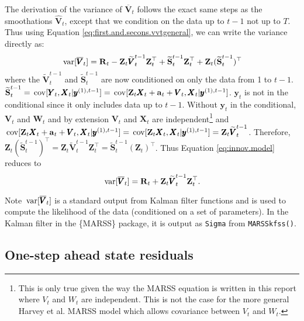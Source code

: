 \documentclass[]{article}
\def\XI{\mbox{\boldmath $\Xi$}}
\def\RR{\mbox{$\mathbf R$}}	 \def\rr{\mbox{$\mathbf r$}} \def\Rb{\mbox{$\mathbf H$}}	\def\Rm{\mathbb{R}}
\def\Ss{\mbox{$\mathbf S$}}
\def\VV{\mbox{$\pmb{V}$}}	\def\vv{\mbox{$\pmb{v}$}}
\def\WW{\mbox{$\pmb{W}$}}	\def\ww{\mbox{$\pmb{w}$}}
\def\XX{\mbox{$\pmb{X}$}}	\def\xx{\mbox{$\pmb{x}$}}
\def\YY{\mbox{$\pmb{Y}$}}	\def\yy{\mbox{$\pmb{y}$}}
\def\ZZ{\mbox{$\mathbf Z$}}	\def\zz{\mbox{$\mathbf z$}}	\def\Zb{\mbox{$\mathbf M$}} \def\Za{\mbox{$\mathbf N$}} \def\Zm{\XI}
\def\var{\,\textup{\textrm{var}}}
\def\cov{\,\textup{\textrm{cov}}}
\def\hatVt{\widehat{\VV}_t}
\def\checkVt{\overline{\VV}_t}
\def\hatVttm{\widetilde{\VV}_t^{t-1}}
\def\hatSttm{\widetilde{\Ss}_t^{t-1}}
\begin{document}
The derivation of the variance of $\checkVt$ follows the exact same steps as the smoothations $\hatVt$, except that we condition on the data up to $t-1$ not up to $T$. Thus using Equation \ref{eq:first.and.secons.vvtgeneral}, we can write the variance directly as:
\begin{equation}\label{eq:innov.model}
\var[\checkVt] = \RR_t - \ZZ_t \hatVttm \ZZ_t^\top + \hatSttm\ZZ_t^\top + \ZZ_t(\hatSttm)^\top
\end{equation}
where the $\hatVttm$ and $\hatSttm$ are now conditioned on only the data from 1 to $t-1$.
$\hatSttm = \cov[\YY_t,\XX_t|\yy^{(1), t-1}] = \cov[\ZZ_t \XX_t + \aa_t+\VV_t,\XX_t|\yy^{(1), t-1}]$. 
$\yy_t$ is not in the conditional since it only includes data up to $t-1$. Without $\yy_t$ in the conditional, $\VV_t$ and $\WW_t$ and by extension $\VV_t$ and $\XX_t$ are independent\footnote{This is only true given the way the MARSS equation is written in this report where $V_t$ and $W_t$ are independent. This is not the case for the more general Harvey et al. MARSS model which allows covariance between $V_t$ and $W_t$.} and $\cov[\ZZ_t \XX_t + \aa_t + \VV_t,\XX_t|\yy^{(1), t-1}] = \cov[\ZZ_t \XX_t,\XX_t|\yy^{(1), t-1}] = \ZZ_t \hatVttm$. Therefore, $\ZZ_t(\hatSttm)^\top =  \ZZ_t \hatVttm \ZZ_t^\top = \hatSttm(\ZZ_t)^\top$. Thus Equation \ref{eq:innov.model} reduces to
\begin{equation}\label{eq:innov.model2}
\var[\checkVt] = \RR_t + \ZZ_t \hatVttm \ZZ_t^\top.
\end{equation}

Note $\var[\checkVt]$ is a standard output from Kalman filter functions and is used to compute the likelihood of the data (conditioned on a set of parameters). In the Kalman filter in the \{MARSS\} package, it is output as \texttt{Sigma} from \texttt{MARSSkfss()}.


\subsection{One-step ahead state residuals}
\end{document}
